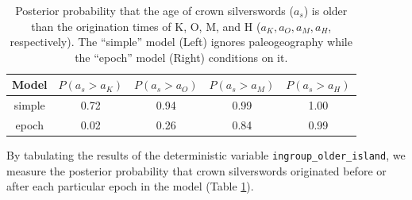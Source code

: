 \begin{table}[!h]
\centering
\begin{tabular}{c|cccc}
Model       & $P(a_s>a_K)$ & $P(a_s>a_O)$ & $P(a_s>a_M)$ & $P(a_s>a_H)$ \\ \hline
simple & 0.72 & 0.94 & 0.99 & 1.00 \\
epoch & 0.02 & 0.26 & 0.84 & 0.99 \\
\end{tabular}
\caption{Posterior probability that the age of crown silverswords ($a_s$) is older than the origination times of K, O, M, and H ($a_K, a_O, a_M, a_H$, respectively). The ``simple'' model (Left) ignores paleogeography while the ``epoch'' model (Right) conditions on it.}
\label{tab:epoch_ages}
\end{table}

By tabulating the results of the deterministic variable {\tt ingroup\_older\_island}, we measure the posterior probability that crown silverswords originated before or after each particular epoch in the model (Table \ref{tab:epoch_ages}).


\newpage
